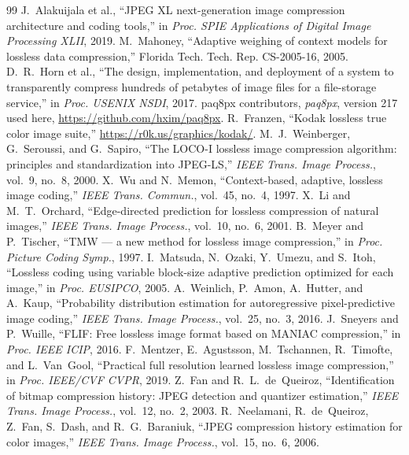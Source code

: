 \documentclass[10pt,twocolumn]{article}
\begin{document}
\small
\balance
\begin{thebibliography}{99}\setlength\itemsep{1pt}
 J.~Alakuijala et al., ``JPEG XL next-generation image compression architecture and coding tools,'' in \emph{Proc. SPIE Applications of Digital Image Processing XLII}, 2019.
 M.~Mahoney, ``Adaptive weighing of context models for lossless data compression,'' Florida Tech. Tech. Rep. CS-2005-16, 2005.
 D.~R.~Horn et al., ``The design, implementation, and deployment of a system to transparently compress hundreds of petabytes of image files for a file-storage service,'' in \emph{Proc. USENIX NSDI}, 2017.
 paq8px contributors, \emph{paq8px}, version 217 used here, \url{https://github.com/hxim/paq8px}.
 R.~Franzen, ``Kodak lossless true color image suite,'' \url{https://r0k.us/graphics/kodak/}.
 M.~J.~Weinberger, G.~Seroussi, and G.~Sapiro, ``The LOCO-I lossless image compression algorithm: principles and standardization into JPEG-LS,'' \emph{IEEE Trans. Image Process.}, vol.~9, no.~8, 2000.
 X.~Wu and N.~Memon, ``Context-based, adaptive, lossless image coding,'' \emph{IEEE Trans. Commun.}, vol.~45, no.~4, 1997.
 X.~Li and M.~T.~Orchard, ``Edge-directed prediction for lossless compression of natural images,'' \emph{IEEE Trans. Image Process.}, vol.~10, no.~6, 2001.
 B.~Meyer and P.~Tischer, ``TMW --- a new method for lossless image compression,'' in \emph{Proc. Picture Coding Symp.}, 1997.
 I.~Matsuda, N.~Ozaki, Y.~Umezu, and S.~Itoh, ``Lossless coding using variable block-size adaptive prediction optimized for each image,'' in \emph{Proc. EUSIPCO}, 2005.
 A.~Weinlich, P.~Amon, A.~Hutter, and A.~Kaup, ``Probability distribution estimation for autoregressive pixel-predictive image coding,'' \emph{IEEE Trans. Image Process.}, vol.~25, no.~3, 2016.
 J.~Sneyers and P.~Wuille, ``FLIF: Free lossless image format based on MANIAC compression,'' in \emph{Proc. IEEE ICIP}, 2016.
 F.~Mentzer, E.~Agustsson, M.~Tschannen, R.~Timofte, and L.~Van~Gool, ``Practical full resolution learned lossless image compression,'' in \emph{Proc. IEEE/CVF CVPR}, 2019.
 Z.~Fan and R.~L.~de~Queiroz, ``Identification of bitmap compression history: JPEG detection and quantizer estimation,'' \emph{IEEE Trans. Image Process.}, vol.~12, no.~2, 2003.
 R.~Neelamani, R.~de~Queiroz, Z.~Fan, S.~Dash, and R.~G.~Baraniuk, ``JPEG compression history estimation for color images,'' \emph{IEEE Trans. Image Process.}, vol.~15, no.~6, 2006.

\end{thebibliography}
\end{document}
